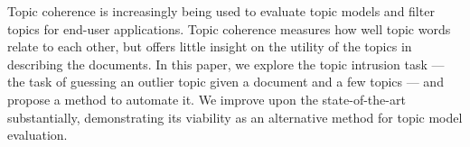 Topic coherence is increasingly being used to evaluate topic models and filter topics for end-user applications. Topic coherence measures how well topic words relate to each other, but offers little insight on the utility of the topics in describing the documents.  In this paper, we explore the topic intrusion task --- the task of guessing an outlier topic given a document and a few topics --- and propose a method to automate it. We improve upon the state-of-the-art substantially, demonstrating its viability as an alternative method for topic model evaluation.
